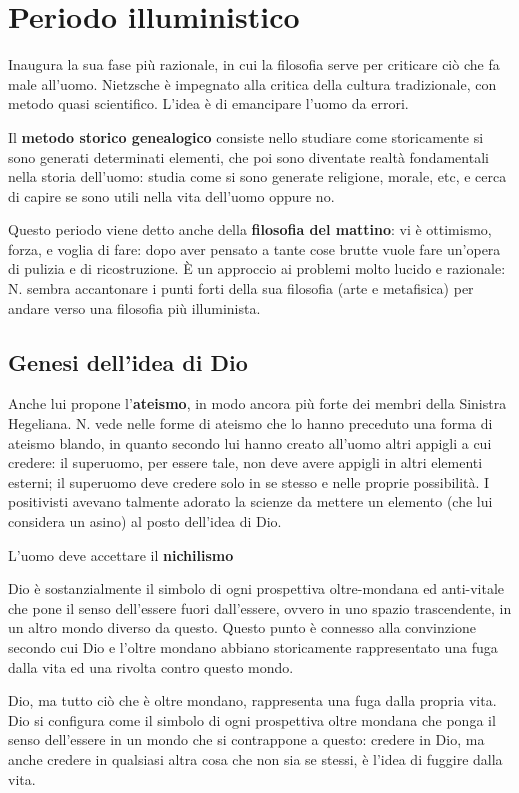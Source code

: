 \documentclass[a4paper, twoside, titlepage]{book}
\begin{document}
\chapter{Periodo illuministico}

Inaugura la sua fase più razionale, in cui la filosofia serve per criticare ciò che fa male all’uomo.
Nietzsche è impegnato alla critica della cultura tradizionale, con metodo quasi scientifico. L’idea è di emancipare l’uomo da errori.

Il \textbf{metodo storico genealogico} consiste nello studiare come storicamente si sono generati determinati elementi, che poi sono diventate realtà fondamentali nella storia dell’uomo: studia come si sono generate religione, morale, etc, e cerca di capire se sono utili nella vita dell’uomo oppure no.

Questo periodo viene detto anche della \textbf{filosofia del mattino}: vi è ottimismo, forza, e voglia di fare: dopo aver pensato a tante cose brutte vuole fare un’opera di pulizia e di ricostruzione.
È un approccio ai problemi molto lucido e razionale: N. sembra accantonare i punti forti della sua filosofia (arte e metafisica) per andare verso una filosofia più illuminista.

\section{Genesi dell'idea di Dio}

Anche lui propone l'\textbf{ateismo}, in modo ancora più forte dei membri della Sinistra Hegeliana.
N. vede nelle forme di ateismo che lo hanno preceduto una forma di ateismo blando, in quanto secondo lui hanno creato all'uomo altri appigli a cui credere: il superuomo, per essere tale, non deve avere appigli in altri elementi esterni; il superuomo deve credere solo in se stesso e nelle proprie possibilità.
I positivisti avevano talmente adorato la scienze da mettere un elemento (che lui considera un asino) al posto dell'idea di Dio.

L'uomo deve accettare il \textbf{nichilismo}

Dio è sostanzialmente il simbolo di ogni prospettiva oltre-mondana ed anti-vitale che pone il senso dell'essere fuori dall'essere, ovvero in uno spazio trascendente, in un altro mondo diverso da questo.
Questo punto è connesso alla convinzione secondo cui Dio e l'oltre mondano abbiano storicamente rappresentato una fuga dalla vita ed una rivolta contro questo mondo.

Dio, ma tutto ciò che è oltre mondano, rappresenta una fuga dalla propria vita. Dio si configura come il simbolo di ogni prospettiva oltre mondana che ponga il senso dell'essere in un mondo che si contrappone a questo: credere in Dio, ma anche credere in qualsiasi altra cosa che non sia se stessi, è l'idea di fuggire dalla vita.
\end{document}
